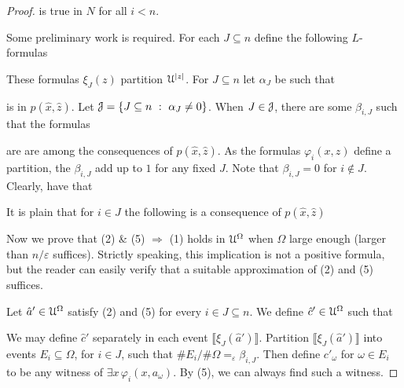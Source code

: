 \documentclass[10pt,oneside]{amsproc}
\begin{document}
{\begin{proof}
  is true in $N$ for all $i<n$.
  
  Some preliminary work is required.
  For each $J\subseteq n$ define the following $L$-formulas


  These formulas $\xi_J(z)$ partition ${\EuScript U}^{|z|}$.
  For $J\subseteq n$ let $\alpha_J$ be such that 
  
  
  is in $p(\hat x,\hat z)$.
  Let ${\EuScript J}=\{J\subseteq n\ :\ \alpha_J\neq0\}$. 
  When $J\in{\EuScript J}$, there are some $\beta_{i,J}$ such that the formulas


  are are among the consequences of $p(\hat x,\hat z)$.
  As the formulas $\varphi_i(x,z)$ define a partition, the $\beta_{i,J}$ add up to $1$ for any fixed $J$.
  Note that $\beta_{i,J}=0$ for $i\notin J$.
  Clearly, have that 


  It is plain that for $i\in J$ the following is a consequence of $p(\hat x,\hat z)$


  Now we prove that (2) \& (5) $\Rightarrow$ (1) holds in ${\EuScript U}^\Omega$ when $\Omega$ large enough (larger than $n/\varepsilon$ suffices).
  Strictly speaking, this implication is not a positive formula, but the reader can easily verify that a suitable approximation of (2) and (5) suffices. 
  
  Let $\hat a'\in{\EuScript U}^\Omega$ satisfy (2) and (5) for every $i\in J\subseteq n$. 
  We define $\hat c'\in{\EuScript U}^\Omega$ such that 
  
  
  We may define $\hat c'$ separately in each event $\llbracket\xi_J(\hat a')\rrbracket$.
  Partition $\llbracket\xi_J(\hat a')\rrbracket$ into events $E_i\subseteq\Omega$, for $i\in J$, such that $\# E_i/\#\Omega=_\varepsilon\beta_{i,J}$.
  Then define $c'_\omega$ for $\omega\in E_i$ to be any witness of $\exists x\,\varphi_i(x,a_\omega)$.
  By (5), we can always find such a witness.
  

\end{proof}}
\end{document}
